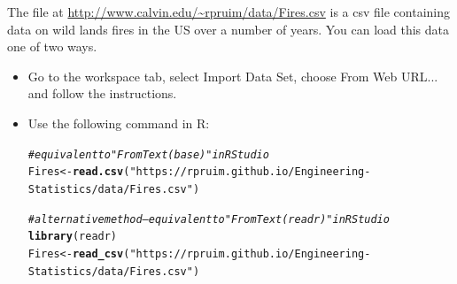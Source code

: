\documentclass[twoside]{book}\usepackage[]{graphicx}\usepackage[]{xcolor}
\makeatletter
\newcommand{\hlstr}[1]{\textcolor[rgb]{0.192,0.494,0.8}{#1}}%
\newcommand{\hlcom}[1]{\textcolor[rgb]{0.678,0.584,0.686}{\textit{#1}}}%
\newcommand{\hlstd}[1]{\textcolor[rgb]{0.345,0.345,0.345}{#1}}%
\newcommand{\hlkwb}[1]{\textcolor[rgb]{0.69,0.353,0.396}{#1}}%
\newcommand{\hlkwd}[1]{\textcolor[rgb]{0.737,0.353,0.396}{\textbf{#1}}}%
\newenvironment{kframe}{%
 \def\at@end@of@kframe{}%
 \ifinner\ifhmode%
  \def\at@end@of@kframe{\end{minipage}}%
  \begin{minipage}{\columnwidth}%
 \fi\fi%
 \def\FrameCommand##1{\hskip\@totalleftmargin \hskip-\fboxsep
 \colorbox{shadecolor}{##1}\hskip-\fboxsep
     \hskip-\linewidth \hskip-\@totalleftmargin \hskip\columnwidth}%
 \MakeFramed {\advance\hsize-\width
   \@totalleftmargin\z@ \linewidth\hsize
   \@setminipage}}%
 {\par\unskip\endMakeFramed%
 \at@end@of@kframe}
\newenvironment{knitrout}{}{} %
\def\R{{\sf R}}
\def\tab#1{{\sf #1}}
\makeatother
\begin{document}
\begin{problem}The file at \url{http://www.calvin.edu/~rpruim/data/Fires.csv}
	is a csv file containing data on wild lands fires in the US over a number of years.
You can load this data one of two ways.
\begin{itemize}
	\item
		Go to the workspace tab, select \tab{Import Data Set}, choose \tab{From Web URL...}
		and follow the instructions.
	\item
		Use the following command in \R:
		
\begin{knitrout}
\color{fgcolor}\begin{kframe}
\begin{alltt}
\hlcom{# equivalent to "From Text (base)" in RStudio}
\hlstd{Fires} \hlkwb{<-} \hlkwd{read.csv}\hlstd{(}\hlstr{"https://rpruim.github.io/Engineering-Statistics/data/Fires.csv"}\hlstd{)}

\hlcom{# alternative method -- equivalent to "From Text (readr)" in RStudio}
\hlkwd{library}\hlstd{(readr)}
\hlstd{Fires} \hlkwb{<-} \hlkwd{read_csv}\hlstd{(}\hlstr{"https://rpruim.github.io/Engineering-Statistics/data/Fires.csv"}\hlstd{)}
\end{alltt}



\end{kframe}
\end{knitrout}
\end{itemize}
\end{problem}
\end{document}

